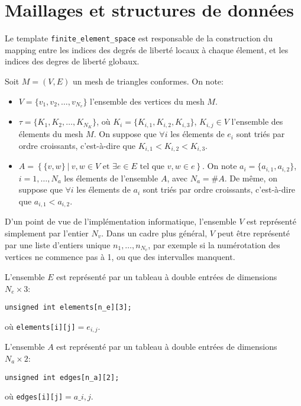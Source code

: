 \section{Maillages et structures de donn\'ees}

Le template \texttt{finite\_element\_space} est responsable de la
construction du mapping entre les indices des degr\'es de libert\'e
locaux \`a chaque \'element, et les indices des degres de libert\'e
globaux.

Soit $M = (V, E)$ un mesh de triangles conformes. On note:
\begin{itemize}
\item $V = \{v_1, v_2, \dots, v_{N_v}\}$ l'ensemble des vertices du
  mesh $M$.
  
\item $\tau = \{K_1, K_2, \dots, K_{N_K}\}$, o\`u $K_i = \{K_{i,1},
  K_{i,2}, K_{i,3}\}$, $K_{i,j}\in V$ l'ensemble des \'elements du
  mesh $M$. On suppose que $\forall i$ les \'elements de $e_i$ sont tri\'es par
  ordre croissants, c'est-\`a-dire que $K_{i,1} < K_{i,2} < K_{i,3}$.
  
\item $A = \left\{ \{v, w\}\ |\ v,w\in V \text{ et } \exists e\in E
  \text{ tel que } v,w \in e\right\}$. On note $a_i = \{a_{i,1},
  a_{i,2}\}$, $i = 1, \dots, N_{a}$ les \'elements de l'ensemble $A$,
  avec $N_a = \#A$. De m\^eme, on suppose que $\forall i$ les \'elements de
  $a_i$ sont tri\'es par ordre croissants, c'est-\`a-dire
  que $a_{i,1} < a_{i,2}$.
\end{itemize}

D'un point de vue de l'impl\'ementation informatique, l'ensemble $V$
est repr\'esent\'e simplement par l'entier $N_v$. Dans un cadre plus
g\'en\'eral, $V$ peut \^etre repr\'esent\'e par une liste d'entiers
unique ${n_1, \dots, n_{N_v}}$, par exemple si la num\'erotation des
vertices ne commence pas \`a 1, ou que des intervalles manquent.

L'ensemble $E$ est repr\'esent\'e par un tableau \`a double entr\'ees
de dimensions $N_e \times 3$:
\begin{addmargin}[0.5in]{0em}
  \texttt{unsigned int elements[n\_e][3];}
\end{addmargin}
o\`u \texttt{elements[i][j]}$ = e_{i,j}$.

L'ensemble $A$ est repr\'esent\'e par un tableau \`a double entr\'ees
de dimensions $N_a \times 2$:
\begin{addmargin}[0.5in]{0em}
  \texttt{unsigned int edges[n\_a][2];}
\end{addmargin}
o\`u \texttt{edges[i][j]}$ = a\_{i,j}$.


